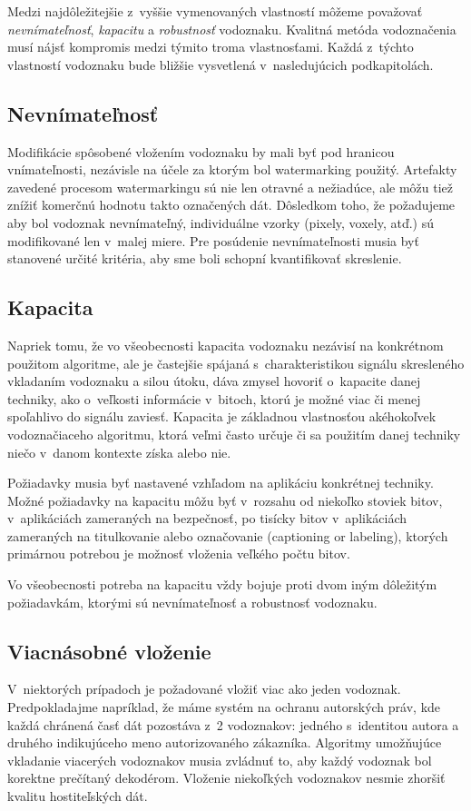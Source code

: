 Medzi najdôležitejšie z~vyššie vymenovaných vlastností môžeme považovať {\it nevnímateľnosť}, {\it kapacitu} a {\it robustnosť} vodoznaku. Kvalitná metóda vodoznačenia musí nájsť kompromis medzi týmito troma vlastnosťami. Každá z~týchto vlastností vodoznaku bude bližšie vysvetlená v~nasledujúcich podkapitolách.

\subsection{Nevnímateľnosť}
Modifikácie spôsobené vložením vodoznaku by mali byť pod hranicou vnímateľnosti, nezávisle na účele za ktorým bol watermarking použitý. Artefakty zavedené procesom watermarkingu sú nie len otravné a nežiadúce, ale môžu tiež znížiť komerčnú hodnotu takto označených dát. Dôsledkom toho, že požadujeme aby bol vodoznak nevnímateľný, individuálne vzorky (pixely, voxely, atď.) sú modifikované len v~malej miere. Pre posúdenie nevnímateľnosti musia byť stanovené určité kritéria, aby sme boli schopní kvantifikovať skreslenie. \cite{Katzenbeisser}

\subsection{Kapacita}
Napriek tomu, že vo všeobecnosti kapacita vodoznaku nezávisí na konkrétnom použitom algoritme, ale je častejšie spájaná s~charakteristikou signálu skresleného vkladaním vodoznaku a silou útoku, dáva zmysel hovoriť o~kapacite danej techniky, ako o~veľkosti informácie v~bitoch, ktorú je možné viac či menej spoľahlivo do signálu zaviesť.
Kapacita je základnou vlastnosťou akéhokoľvek vodoznačiaceho algoritmu, ktorá veľmi často určuje či sa použitím danej techniky niečo v~danom kontexte získa alebo nie.

Požiadavky musia byť nastavené vzhľadom na aplikáciu konkrétnej techniky. Možné požiadavky na kapacitu môžu byť v~rozsahu od niekoľko stoviek bitov, v~aplikáciách zameraných na bezpečnosť, po tisícky bitov v~aplikáciách zameraných na titulkovanie alebo označovanie (captioning or labeling), ktorých primárnou potrebou je možnosť vloženia veľkého počtu bitov.

Vo všeobecnosti potreba na kapacitu vždy bojuje proti dvom iným dôležitým požiadavkám, ktorými sú nevnímateľnosť a robustnosť vodoznaku. \cite{Barni}

\subsection{Viacnásobné vloženie}
V~niektorých prípadoch je požadované vložiť viac ako jeden vodoznak. Predpokladajme napríklad, že máme systém na ochranu autorských práv, kde každá chránená časť dát pozostáva z~2 vodoznakov: jedného s~identitou autora a druhého indikujúceho meno autorizovaného zákazníka. Algoritmy umožňujúce vkladanie viacerých vodoznakov musia zvládnuť to, aby každý vodoznak bol korektne prečítaný dekodérom. Vloženie niekoľkých vodoznakov nesmie zhoršiť kvalitu hostiteľských dát. \cite{Barni}
